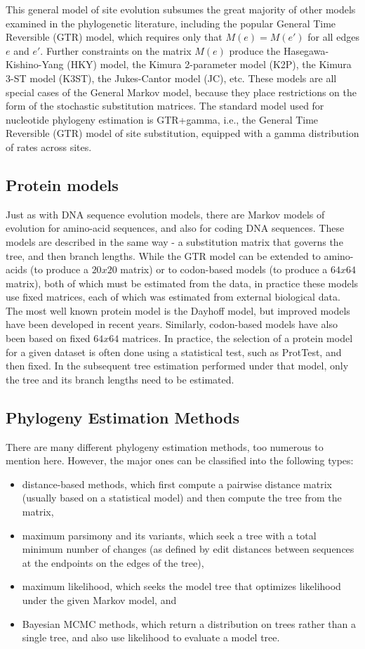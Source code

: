 This general model of site evolution subsumes the great majority of other models
examined in the phylogenetic literature, including the popular General Time Reversible
(GTR) model, which requires only that $M(e) = M(e')$
for all edges $e$ and $e'$. 
Further constraints on the matrix $M(e)$ produce the Hasegawa-Kishino-Yang (HKY) model,
the Kimura 2-parameter model (K2P), the Kimura 3-ST model (K3ST), the Jukes-Cantor
model (JC), etc. These models are all special cases of the General Markov model, because
they place restrictions on the form of the stochastic substitution matrices. The standard
model used for nucleotide phylogeny estimation is GTR+gamma, i.e., the General Time
Reversible (GTR) model of site substitution, equipped with a gamma distribution of rates
across sites.

\subsection{Protein models}
Just as with DNA sequence evolution models, there are Markov
models of evolution for amino-acid sequences, and also for coding DNA sequences. These
models are described in the same way - a substitution matrix that governs the tree,
and then branch lengths. While the GTR model can be extended to amino-acids (to
produce a $20x20$ matrix) or to codon-based models (to produce a $64x64$ matrix), both
of which must be estimated from the data, in practice these models use fixed matrices,
each of which was estimated from external biological data. The most well known protein
model is the Dayhoff model, but improved models have been developed in recent
years. Similarly, codon-based models have also been based on fixed $64x64$
matrices. In practice, the selection of a protein model for a given dataset
is often done using a statistical test, such as ProtTest, and then fixed. In the
subsequent tree estimation performed under that model, only the tree and its branch
lengths need to be estimated.

\subsection{Phylogeny Estimation Methods}
There are many different phylogeny estimation methods, too numerous to mention here.
However, the major ones can be classified into the following types:

\begin{itemize}
	\item distance-based methods, which first compute a pairwise distance matrix (usually
based on a statistical model) and then compute the tree from the matrix,
	\item maximum parsimony and its variants, which seek a tree with a total minimum
number of changes (as defined by edit distances between sequences at the endpoints
on the edges of the tree),
	\item maximum likelihood, which seeks the model tree that optimizes likelihood
under the given Markov model, and
	\item Bayesian MCMC methods, which return a distribution on trees rather than a single
tree, and also use likelihood to evaluate a model tree.	
\end{itemize}

